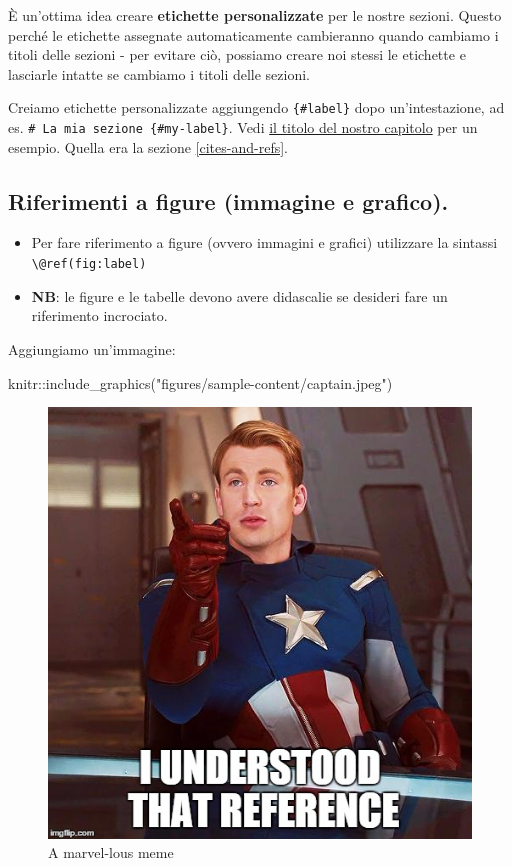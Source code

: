 \documentclass[a4paper, 11pt, nobind]{templates/ociamthesis}
\providecommand{\tightlist}{%
  \setlength{\itemsep}{0pt}\setlength{\parskip}{0pt}}
\newenvironment{Shaded}{\begin{snugshade}}{\end{snugshade}}
\newcommand{\FunctionTok}[1]{\textcolor[rgb]{0.00,0.00,0.00}{#1}}
\newcommand{\NormalTok}[1]{#1}
\newcommand{\SpecialCharTok}[1]{\textcolor[rgb]{0.00,0.00,0.00}{#1}}
\newcommand{\StringTok}[1]{\textcolor[rgb]{0.31,0.60,0.02}{#1}}
\renewenvironment{Shaded}
{
  \vspace{10pt}%
  \begin{snugshade}%
}{%
  \end{snugshade}%
  \vspace{8pt}%
}
\begin{document}
È un'ottima idea creare \textbf{etichette personalizzate} per le nostre sezioni. Questo perché le etichette assegnate automaticamente cambieranno quando cambiamo i titoli delle sezioni - per evitare ciò, possiamo creare noi stessi le etichette e lasciarle intatte se cambiamo i titoli delle sezioni.

Creiamo etichette personalizzate aggiungendo \texttt{\{\#label\}} dopo un'intestazione, ad es. \texttt{\#\ La\ mia\ sezione\ \{\#my-label\}}.
Vedi \protect\hyperlink{cites-and-refs}{il titolo del nostro capitolo} per un esempio. Quella era la sezione \ref{cites-and-refs}.

\hypertarget{riferimenti-a-figure-immagine-e-grafico.}{%
\subsection{Riferimenti a figure (immagine e grafico).}\label{riferimenti-a-figure-immagine-e-grafico.}}

\begin{itemize}
\tightlist
\item
  Per fare riferimento a figure (ovvero immagini e grafici) utilizzare la sintassi \texttt{\textbackslash{}@ref(fig:label)}
\item
  \textbf{NB}: le figure e le tabelle devono avere didascalie se desideri fare un riferimento incrociato.
\end{itemize}

Aggiungiamo un'immagine:

\begin{Shaded}
\begin{Highlighting}[]
\NormalTok{knitr}\SpecialCharTok{::}\FunctionTok{include\_graphics}\NormalTok{(}\StringTok{"figures/sample{-}content/captain.jpeg"}\NormalTok{)}
\end{Highlighting}
\end{Shaded}

\begin{figure}

{\centering \includegraphics[width=0.65\linewidth]{figures/sample-content/captain} 

}

\caption{A marvel-lous meme}\label{fig:capitano}
\end{figure}
\end{document}
